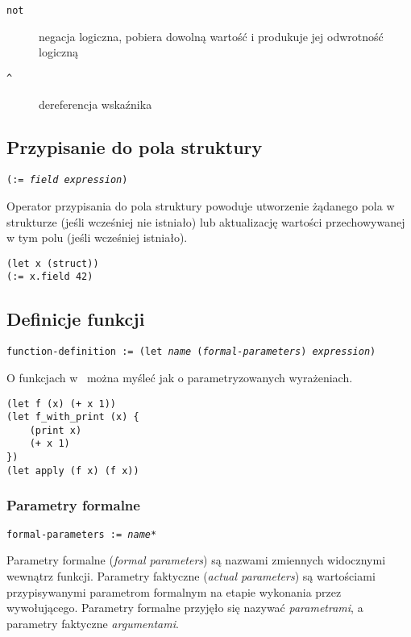 \begin{description}
    \item[\texttt{not}] negacja logiczna, pobiera dowolną wartość i produkuje jej odwrotność logiczną
    \item[\texttt{\^}] dereferencja wskaźnika
\end{description}

\subsection{Przypisanie do pola struktury}

\texttt{(:= \emph{field} \emph{expression})}
\vspace{1em}

Operator przypisania do pola struktury powoduje utworzenie żądanego pola w strukturze (jeśli wcześniej nie
istniało) lub aktualizację wartości przechowywanej w tym polu (jeśli wcześniej istniało).

\begin{lstlisting}
(let x (struct))
(:= x.field 42)
\end{lstlisting}

\subsection{Definicje funkcji}

\texttt{function-definition := (let \emph{name} (\emph{formal-parameters}) \emph{expression})}
\vspace{1em}

O funkcjach w \ViuAct\ można myśleć jak o parametryzowanych wyrażeniach.

\begin{lstlisting}
(let f (x) (+ x 1))
(let f_with_print (x) {
    (print x)
    (+ x 1)
})
(let apply (f x) (f x))
\end{lstlisting}

\subsubsection{Parametry formalne}

\texttt{formal-parameters := \emph{name}*}
\vspace{1em}

Parametry formalne (\emph{formal parameters}) są nazwami zmiennych widocznymi
wewnątrz funkcji. Parametry faktyczne (\emph{actual parameters}) są wartościami
przypisywanymi parametrom formalnym na etapie wykonania przez wywołującego.
Parametry formalne przyjęło się nazywać \emph{parametrami}, a parametry
faktyczne \emph{argumentami}.

